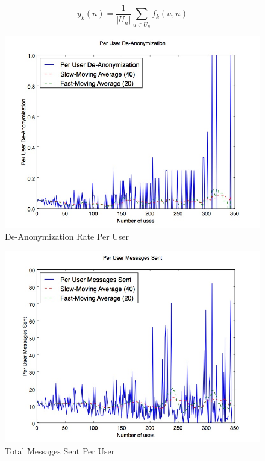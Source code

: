 $$ y_k(n) = \frac{1}{|U_n|}\sum_{u \in U_n}{f_k(u, n)} $$

\begin{figure}[H]
\centering
\includegraphics[trim= 0mm 0mm 0mm 0mm, clip, scale=0.5]{./Figures/PerUserDe-Anonymization.jpg}
\caption{De-Anonymization Rate Per User}
\label{fig:PerUserFBConnect}
\end{figure}

\begin{figure}[H]
\centering
\includegraphics[trim= 0mm 0mm 0mm 0mm, clip, scale=0.5]{./Figures/PerUserMessagesSent.jpg}
\caption{Total Messages Sent Per User}
\label{fig:PerUserMessagesSent}
\end{figure}

